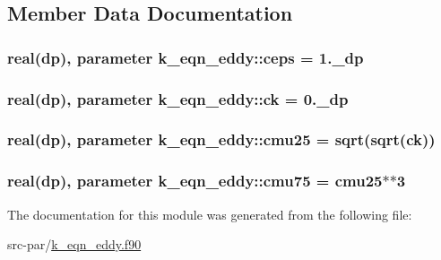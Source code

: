 \subsection{Member Data Documentation}
\hypertarget{classk__eqn__eddy_a4dd1902f2410d71ff09dac839034fe26}{
\subsubsection[{ceps}]{\setlength{\rightskip}{0pt plus 5cm}real(dp), parameter k\-\_\-eqn\-\_\-eddy\-::ceps = 1.\-\_\-dp}}\label{classk__eqn__eddy_a4dd1902f2410d71ff09dac839034fe26}
\hypertarget{classk__eqn__eddy_a65e5913ad8e939fa283e9608855a9031}{
\subsubsection[{ck}]{\setlength{\rightskip}{0pt plus 5cm}real(dp), parameter k\-\_\-eqn\-\_\-eddy\-::ck = 0.\-\_\-dp}}\label{classk__eqn__eddy_a65e5913ad8e939fa283e9608855a9031}
\hypertarget{classk__eqn__eddy_aa3cac83643e2f03b15da3e47e3fffeba}{
\subsubsection[{cmu25}]{\setlength{\rightskip}{0pt plus 5cm}real(dp), parameter k\-\_\-eqn\-\_\-eddy\-::cmu25 = sqrt(sqrt({\bf ck}))}}\label{classk__eqn__eddy_aa3cac83643e2f03b15da3e47e3fffeba}
\hypertarget{classk__eqn__eddy_ac0518f6f4e948a91b594edd73676577a}{
\subsubsection[{cmu75}]{\setlength{\rightskip}{0pt plus 5cm}real(dp), parameter k\-\_\-eqn\-\_\-eddy\-::cmu75 = {\bf cmu25}$\ast$$\ast$3}}\label{classk__eqn__eddy_ac0518f6f4e948a91b594edd73676577a}


The documentation for this module was generated from the following file\-:\begin{DoxyCompactItemize}
\item 
src-\/par/\hyperlink{k__eqn__eddy_8f90}{k\-\_\-eqn\-\_\-eddy.\-f90}\end{DoxyCompactItemize}
